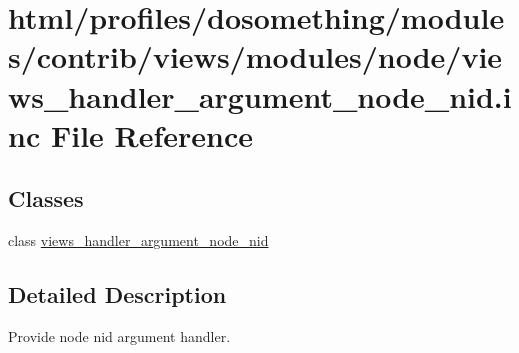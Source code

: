 \hypertarget{views__handler__argument__node__nid_8inc}{
\section{html/profiles/dosomething/modules/contrib/views/modules/node/views\_\-handler\_\-argument\_\-node\_\-nid.inc File Reference}
\label{views__handler__argument__node__nid_8inc}
}
\subsection*{Classes}
\begin{DoxyCompactItemize}
\item 
class \hyperlink{classviews__handler__argument__node__nid}{views\_\-handler\_\-argument\_\-node\_\-nid}
\end{DoxyCompactItemize}


\subsection{Detailed Description}
Provide node nid argument handler. 